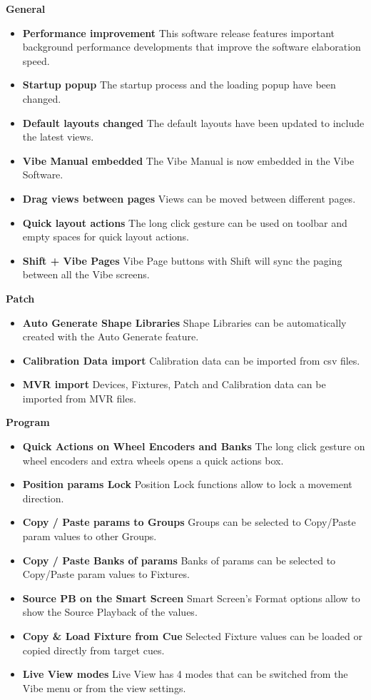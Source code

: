 \documentclass[
]{article}
\begin{document}
\textbf{General}

\begin{itemize}
\item
  \textbf{Performance improvement} This software release features important background performance developments that improve the software elaboration speed.
\item
  \textbf{Startup popup} The startup process and the loading popup have been changed.
\item
  \textbf{Default layouts changed} The default layouts have been updated to include the latest views.
\item
  \textbf{Vibe Manual embedded} The Vibe Manual is now embedded in the Vibe Software.
\item
  \textbf{Drag views between pages} Views can be moved between different pages.
\item
  \textbf{Quick layout actions} The long click gesture can be used on toolbar and empty spaces for quick layout actions.
\item
  \textbf{Shift + Vibe Pages} Vibe Page buttons with Shift will sync the paging between all the Vibe screens.
\end{itemize}

\textbf{Patch}

\begin{itemize}
\item
  \textbf{Auto Generate Shape Libraries} Shape Libraries can be automatically created with the Auto Generate feature.
\item
  \textbf{Calibration Data import} Calibration data can be imported from csv files.
\item
  \textbf{MVR import} Devices, Fixtures, Patch and Calibration data can be imported from MVR files.
\end{itemize}

\textbf{Program}

\begin{itemize}
\item
  \textbf{Quick Actions on Wheel Encoders and Banks} The long click gesture on wheel encoders and extra wheels opens a quick actions box.
\item
  \textbf{Position params Lock} Position Lock functions allow to lock a movement direction.
\item
  \textbf{Copy / Paste params to Groups} Groups can be selected to Copy/Paste param values to other Groups.
\item
  \textbf{Copy / Paste Banks of params} Banks of params can be selected to Copy/Paste param values to Fixtures.
\item
  \textbf{Source PB on the Smart Screen} Smart Screen's Format options allow to show the Source Playback of the values.
\item
  \textbf{Copy \& Load Fixture from Cue} Selected Fixture values can be loaded or copied directly from target cues.
\item
  \textbf{Live View modes} Live View has 4 modes that can be switched from the Vibe menu or from the view settings.
\end{itemize}
\end{document}
